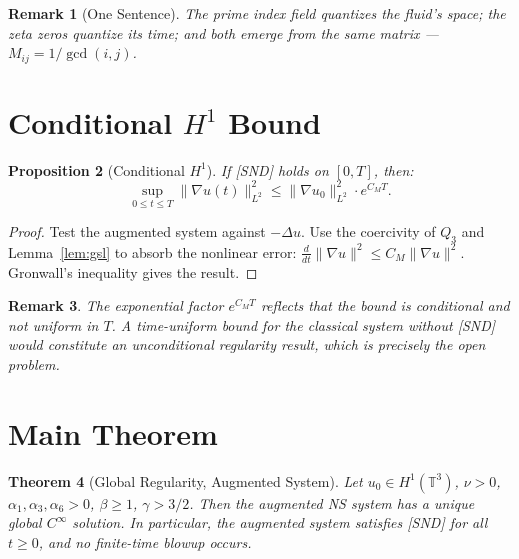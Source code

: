 \documentclass[11pt]{article}
\newtheorem{theorem}{Theorem}[section]
\newtheorem{proposition}[theorem]{Proposition}
\newtheorem{remark}[theorem]{Remark}
\begin{document}
\begin{remark}[One Sentence]
The prime index field quantizes the fluid's space; the zeta zeros
quantize its time; and both emerge from the same matrix --- $M_{ij} = 1/\gcd(i,j)$.
\end{remark}



\section{Conditional $H^1$ Bound}

\begin{proposition}[Conditional $H^1$]\label{prop:H1}
If \emph{[SND]} holds on $[0,T]$, then:
\[
\sup_{0\leq t\leq T}\|\nabla u(t)\|^2_{L^2}
\leq \|\nabla u_0\|^2_{L^2}\cdot e^{C_M T}.
\]
\end{proposition}

\begin{proof}
Test the augmented system against $-\Delta u$. Use the coercivity of $Q_3$
and Lemma~\ref{lem:gsl} to absorb the nonlinear error:
$\frac{d}{dt}\|\nabla u\|^2 \leq C_M\|\nabla u\|^2$.
Gronwall's inequality gives the result.
\end{proof}

\begin{remark}
The exponential factor $e^{C_M T}$ reflects that the bound is conditional and not
uniform in $T$. A time-uniform bound for the classical system without [SND] would
constitute an unconditional regularity result, which is precisely the open problem.
\end{remark}

\section{Main Theorem}\label{sec:main}

\begin{theorem}[Global Regularity, Augmented System]\label{thm:main}
Let $u_0\in H^1(\mathbb{T}^3)$, $\nu>0$, $\alpha_1,\alpha_3,\alpha_6>0$,
$\beta\geq 1$, $\gamma>3/2$. Then the augmented NS system has a unique global
$C^\infty$ solution. In particular, the augmented system satisfies [SND] for all $t\geq 0$,
and no finite-time blowup occurs.
\end{theorem}
\end{document}

